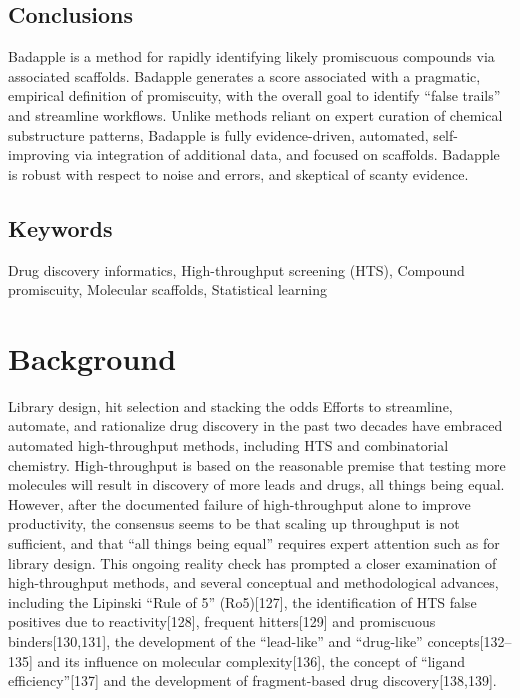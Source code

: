 \subsection{Conclusions} 

Badapple is a method for rapidly identifying likely promiscuous compounds via associated scaffolds. Badapple generates a score associated with a pragmatic, empirical definition of promiscuity, with the overall goal to identify “false trails” and streamline workflows. Unlike methods reliant on expert curation of chemical substructure patterns, Badapple is fully evidence-driven, automated, self-improving via integration of additional data, and focused on scaffolds. Badapple is robust with respect to noise and errors, and skeptical of scanty evidence.

\subsection{Keywords}

Drug discovery informatics, High-throughput screening (HTS), Compound promiscuity, Molecular scaffolds, Statistical learning

\section{Background}

Library design, hit selection and stacking the odds
Efforts to streamline, automate, and rationalize drug discovery in the past two decades have embraced automated high-throughput methods, including HTS and combinatorial chemistry. High-throughput is based on the reasonable premise that testing more molecules will result in discovery of more leads and drugs, all things being equal. However, after the documented failure of high-throughput alone to improve productivity, the consensus seems to be that scaling up throughput is not sufficient, and that “all things being equal” requires expert attention such as for library design. This ongoing reality check has prompted a closer examination of high-throughput methods, and several conceptual and methodological advances, including the Lipinski “Rule of 5” (Ro5)[127], the identification of HTS false positives due to reactivity[128], frequent hitters[129] and promiscuous binders[130,131], the development of the “lead-like” and “drug-like” concepts[132–135] and its influence on molecular complexity[136], the concept of “ligand efficiency”[137] and the development of fragment-based drug discovery[138,139].

